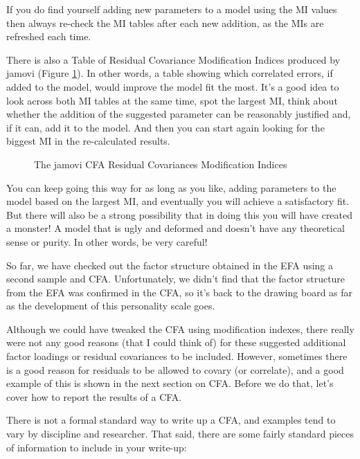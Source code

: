 If you do find yourself adding new parameters to a model using the MI values then always re-check the MI tables after each new addition, as the MIs are refreshed each time.

There is also a Table of Residual Covariance Modification Indices produced by jamovi (Figure \ref{fig:cfa7}). In other words, a table showing which correlated errors, if added to the model, would improve the model fit the most. It's a good idea to look across both MI tables at the same time, spot the largest MI, think about whether the addition of the suggested parameter can be reasonably justified and, if it can, add it to the model. And then you can start again looking for the biggest MI in the re-calculated results. 

\begin{figure}[!htp]
\begin{center}
\caption{The jamovi CFA Residual Covariances Modification Indices}
\label{fig:cfa7}
\HR
\end{center}
\end{figure}

You can keep going this way for as long as you like, adding parameters to the model based on the largest MI, and eventually you will achieve a satisfactory fit. But there will also be a strong possibility that in doing this you will have created a monster! A model that is ugly and deformed and doesn’t have any theoretical sense or purity. In other words, be very careful!

So far, we have checked out the factor structure obtained in the EFA using a second sample and CFA. Unfortunately, we didn’t find that the factor structure from the EFA was confirmed in the CFA, so it’s back to the drawing board as far as the development of this personality scale goes. 

Although we could have tweaked the CFA using modification indexes, there really were not any good reasons (that I could think of) for these suggested additional factor loadings or residual covariances to be included. However, sometimes there is a good reason for residuals to be allowed to covary (or correlate), and a good example of this is shown in the next section on  CFA. Before we do that, let's cover how to report the results of a CFA.


There is not a formal standard way to write up a CFA, and examples tend to vary by discipline and researcher. That said, there are some fairly standard pieces of information to include in your write-up: 

